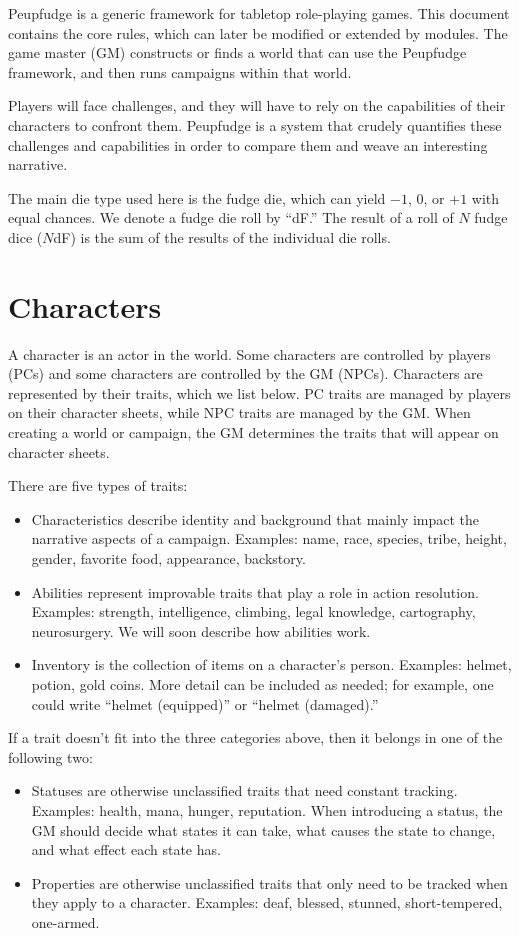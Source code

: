 Peupfudge is a generic framework for tabletop role-playing games.
This document contains the core rules, which can later be modified or extended by modules.
The game master (GM) constructs or finds a world that can use the Peupfudge framework,
and then runs campaigns within that world. 


Players will face challenges, and they will have to rely on the capabilities of their characters to confront them.
Peupfudge is a system that crudely quantifies these challenges and capabilities in order to compare them and weave an interesting narrative.

The main die type used here is the fudge die, which can yield $-1$, $0$, or $+1$ with equal chances.
We denote a fudge die roll by ``dF.'' The result of a roll of $N$ fudge dice ($N$dF) is the sum of the results of the individual die rolls.

\section{Characters}
A character is an actor in the world.
Some characters are controlled by players (PCs) and some characters are controlled by the GM (NPCs).
Characters are represented by their traits, which we list below.
PC traits are managed by players on their character sheets, while NPC traits are managed by the GM.
When creating a world or campaign, the GM determines the traits that will appear on character sheets.

There are five types of traits:
\begin{itemize}
\item
Characteristics describe identity and background that mainly impact the narrative aspects of a campaign.
Examples: name, race, species, tribe, height, gender, favorite food, appearance, backstory.
\item
Abilities represent improvable traits that play a role in action resolution.
Examples: strength, intelligence, climbing, legal knowledge, cartography, neurosurgery.
We will soon describe how abilities work.
\item
Inventory is the collection of items on a character’s person.
Examples: helmet, potion, gold coins.
More detail can be included as needed; for example, one could write “helmet (equipped)” or “helmet (damaged).”
\end{itemize}
If a trait doesn’t fit into the three categories above, then it belongs in one of the following two:
\begin{itemize}
\item
Statuses are otherwise unclassified traits that need constant tracking.
Examples: health, mana, hunger, reputation.
When introducing a status, the GM should decide what states it can take, what causes the state to change, and what effect each state has.
\item
Properties are otherwise unclassified traits that only need to be tracked when they apply to a character.
Examples: deaf, blessed, stunned, short-tempered, one-armed.
\end{itemize}

